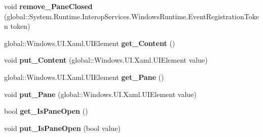 \begin{DoxyCompactItemize}
\item 
\mbox{\label{interface_windows_1_1_u_i_1_1_xaml_1_1_controls_1_1_i_split_view_a6450b9b0d59bee0c4df61f67cba5609e}} 
void {\bfseries remove\+\_\+\+Pane\+Closed} (global\+::\+System.\+Runtime.\+Interop\+Services.\+Windows\+Runtime.\+Event\+Registration\+Token token)
\item 
\mbox{\label{interface_windows_1_1_u_i_1_1_xaml_1_1_controls_1_1_i_split_view_ab894c1ae83bd61f588e1be844b3d9a6f}} 
global\+::\+Windows.\+U\+I.\+Xaml.\+U\+I\+Element {\bfseries get\+\_\+\+Content} ()
\item 
\mbox{\label{interface_windows_1_1_u_i_1_1_xaml_1_1_controls_1_1_i_split_view_a49750de7e2ee3bd1224af98270b5d354}} 
void {\bfseries put\+\_\+\+Content} (global\+::\+Windows.\+U\+I.\+Xaml.\+U\+I\+Element value)
\item 
\mbox{\label{interface_windows_1_1_u_i_1_1_xaml_1_1_controls_1_1_i_split_view_a20373a0e78a10fa6edcfbbb5fc28876f}} 
global\+::\+Windows.\+U\+I.\+Xaml.\+U\+I\+Element {\bfseries get\+\_\+\+Pane} ()
\item 
\mbox{\label{interface_windows_1_1_u_i_1_1_xaml_1_1_controls_1_1_i_split_view_ae154773362c08fdd390cae063a4a432d}} 
void {\bfseries put\+\_\+\+Pane} (global\+::\+Windows.\+U\+I.\+Xaml.\+U\+I\+Element value)
\item 
\mbox{\label{interface_windows_1_1_u_i_1_1_xaml_1_1_controls_1_1_i_split_view_a0d4584bb7eb3b5f27f459450b6bc13e2}} 
bool {\bfseries get\+\_\+\+Is\+Pane\+Open} ()
\item 
\mbox{\label{interface_windows_1_1_u_i_1_1_xaml_1_1_controls_1_1_i_split_view_a676e370b7973fc04fa22ea1c13c5b739}} 
void {\bfseries put\+\_\+\+Is\+Pane\+Open} (bool value)
\item 
\mbox{\label{interface_windows_1_1_u_i_1_1_xaml_1_1_controls_1_1_i_split_view_a99f8d7f7c0235d00bf56e1224ea0410c}} 

\end{DoxyCompactItemize}
